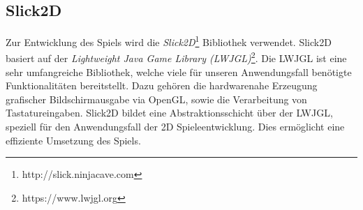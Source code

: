 \subsection{Slick2D}

Zur Entwicklung des Spiels wird die \textit{Slick2D}\footnote{http://slick.ninjacave.com} Bibliothek verwendet.
Slick2D basiert auf der \textit{Lightweight Java Game Library (LWJGL)}\footnote{https://www.lwjgl.org}.
Die LWJGL ist eine sehr umfangreiche Bibliothek, welche viele für unseren Anwendungsfall benötigte Funktionalitäten bereitstellt.
Dazu gehören die hardwarenahe Erzeugung grafischer Bildschirmausgabe via OpenGL, sowie die Verarbeitung von Tastatureingaben.
Slick2D bildet eine Abstraktionsschicht über der LWJGL, speziell für den Anwendungsfall der 2D Spieleentwicklung.
Dies ermöglicht eine effiziente Umsetzung des Spiels.